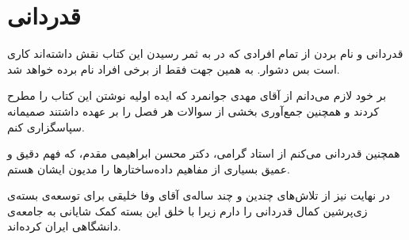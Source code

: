 \section*{قدردانی}
قدردانی و نام بردن از تمام افرادی که در به ثمر رسیدن این کتاب نقش داشته‌اند کاری است بس دشوار. به همین جهت فقط از برخی افراد نام برده خواهد شد.

بر خود لازم می‌دانم از آقای مهدی جوانمرد که ایده‌ اولیه نوشتن این کتاب را مطرح کردند و همچنین جمع‌آوری بخشی از سوالات هر فصل را بر عهده داشتند صمیمانه سپاسگزاری کنم.

همچنین قدردانی می‌کنم از استاد گرامی، دکتر محسن ابراهیمی مقدم، که فهم دقیق و عمیق بسیاری از مفاهیم داده‌ساختارها را مدیون ایشان هستم.

در نهایت نیز از تلاش‌‌های چندین و چند ساله‌ی آقای وفا خلیقی برای توسعه‌ی بسته‌ی زی‌پرشین کمال قدردانی را دارم زیرا با خلق این بسته کمک شایانی به جامعه‌ی دانشگاهی ایران کرده‌اند.